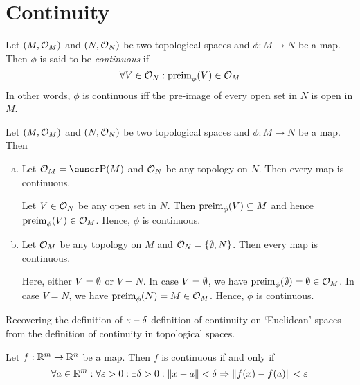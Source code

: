 \section{Continuity}

\begin{definition}[Continuity]
	Let \((M, \mathcal{O}_M)\) and \((N, \mathcal{O}_N)\) be two topological spaces and \(\phi: M \to N\) be a map. Then \(\phi\) is said to be \emph{continuous} if
	\begin{equation}
		\forall V \in \mathcal{O}_N: \operatorname{preim}_{\phi}(V) \in \mathcal{O}_M \label{eq:continuity}
	\end{equation}
	In other words, \(\phi\) is continuous iff the pre-image of every open set in \(N\) is open in \(M\).
\end{definition}

\begin{example}
	Let \((M, \mathcal{O}_M)\) and \((N, \mathcal{O}_N)\) be two topological spaces and \(\phi: M \to N\) be a map. Then
	\begin{enumerate}[(a)]
		\item Let \(\O_M = \powerset(M)\) and \(\mathcal{O}_N\) be any topology on \(N\). Then every map is continuous.

		      Let \(V \in \mathcal{O}_N\) be any open set in \(N\). Then \(\operatorname{preim}_{\phi}(V) \subseteq M\) and hence \(\operatorname{preim}_{\phi}(V) \in \mathcal{O}_M\). Hence, \(\phi\) is continuous.

		\item Let \(\mathcal{O}_M\) be any topology on \(M\) and \(\mathcal{O}_N = \qty{\emptyset, N}\). Then every map is continuous.

		      Here, either \(V = \emptyset\) or \(V = N\). In case \(V = \emptyset\), we have \(\operatorname{preim}_{\phi}(\emptyset) = \emptyset \in \mathcal{O}_M\). In case \(V = N\), we have \(\operatorname{preim}_{\phi}(N) = M \in \mathcal{O}_M\). Hence, \(\phi\) is continuous.
	\end{enumerate}
\end{example}

Recovering the definition of \(\varepsilon-\delta\) definition of continuity on `Euclidean' spaces from the definition of continuity in topological spaces.
\begin{theorem}
	Let \(f: \mathbb R^m \to \mathbb R^n\) be a map. Then \(f\) is continuous if and only if
	\begin{equation}
		\forall a \in \mathbb R^m: \forall \varepsilon > 0: \exists \delta > 0: \norm{x - a} < \delta \Rightarrow \norm{f(x) - f(a)} < \varepsilon \label{eq:continuity_Rm_Rn}
	\end{equation}
\end{theorem}

